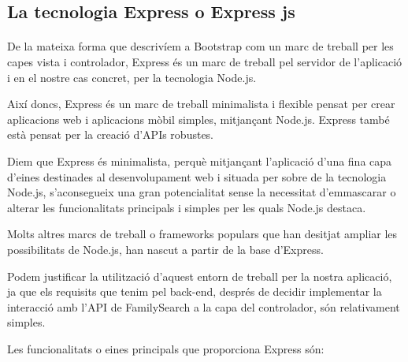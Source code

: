 \subsection{La tecnologia Express o Express js}

    \paragraph{}
    De la mateixa forma que descrivíem a Bootstrap com un marc de treball per les capes vista i controlador, Express és un marc de treball pel servidor de l'aplicació i en el nostre cas concret, per la tecnologia Node.js.

    Així doncs, Express és un marc de treball minimalista i flexible pensat per crear aplicacions web i aplicacions mòbil simples, mitjançant Node.js. Express també està pensat per la creació d'APIs robustes.

    Diem que Express és minimalista, perquè mitjançant l'aplicació d'una fina capa d'eines destinades al desenvolupament web i situada per sobre de la tecnologia Node.js, s'aconsegueix una gran potencialitat sense la necessitat d'emmascarar o alterar les funcionalitats principals i simples per les quals Node.js destaca.

    Molts altres marcs de treball o frameworks populars que han desitjat ampliar les possibilitats de Node.js, han nascut a partir de la base d'Express.

    Podem justificar la utilització d'aquest entorn de treball per la nostra aplicació, ja que els requisits que tenim pel back-end, després de decidir implementar la interacció amb l'API de FamilySearch a la capa del controlador,  són relativament simples.

    Les funcionalitats o eines principals que proporciona Express són:

